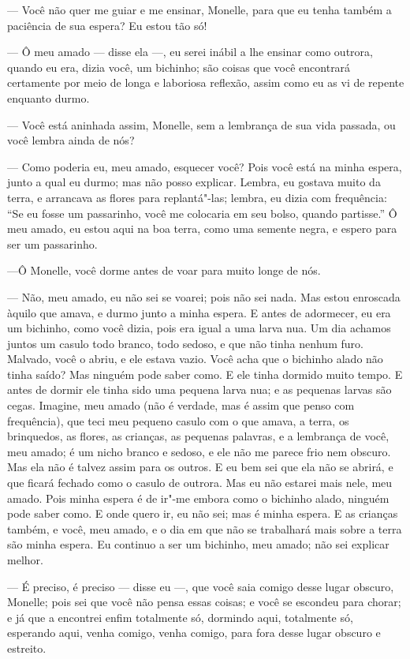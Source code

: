 --- Você não quer me guiar e me ensinar, Monelle, para que eu tenha
também a paciência de sua espera? Eu estou tão só!

--- Ô meu amado --- disse ela ---, eu serei inábil a lhe ensinar como outrora,
quando eu era, dizia você, um bichinho; são coisas que você encontrará
certamente por meio de longa e laboriosa reflexão, assim como eu as vi de
repente enquanto durmo.

--- Você está aninhada assim, Monelle, sem a lembrança de sua vida
passada, ou você lembra ainda de nós?

--- Como poderia eu, meu amado, esquecer você? Pois você está na minha
espera, junto a qual eu durmo; mas não posso explicar. Lembra, eu gostava
muito da terra, e arrancava as flores para replantá"-las; lembra, eu dizia
com frequência: “Se eu fosse um passarinho, você me colocaria em seu
bolso, quando partisse.” Ô meu amado, eu estou aqui na boa terra, como uma
semente negra, e espero para ser um passarinho.

---Ô Monelle, você dorme antes de voar para muito longe de nós.

--- Não, meu amado, eu não sei se voarei; pois não sei nada. Mas estou
enroscada àquilo que amava, e durmo junto a minha espera. E antes de
adormecer, eu era um bichinho, como você dizia, pois era igual a uma larva
nua. Um dia achamos juntos um casulo todo branco, todo sedoso, e que não
tinha nenhum furo. Malvado, você o abriu, e ele estava vazio. Você acha
que o bichinho alado não tinha saído? Mas ninguém pode saber como. E ele
tinha dormido muito tempo. E antes de dormir ele tinha sido uma pequena
larva nua; e as pequenas larvas são cegas. Imagine, meu amado (não é
verdade, mas é assim que penso com frequência), que teci meu pequeno
casulo com o que amava, a terra, os brinquedos, as flores, as crianças, as
pequenas palavras, e a lembrança de você, meu amado; é um nicho branco e
sedoso, e ele não me parece frio nem obscuro. Mas ela não é talvez assim
para os outros. E eu bem sei que ela não se abrirá, e que ficará fechado
como o casulo de outrora. Mas eu não estarei mais nele, meu amado. Pois
minha espera é de ir"-me embora como o bichinho alado, ninguém pode saber
como. E onde quero ir, eu não sei; mas é minha espera. E as crianças
também, e você, meu amado, e o dia em que não se trabalhará mais sobre a
terra são minha espera. Eu continuo a ser um bichinho, meu amado; não sei
explicar melhor.

--- É preciso, é preciso --- disse eu ---, que você saia comigo desse lugar
obscuro, Monelle; pois sei que você não pensa essas coisas; e você se
escondeu para chorar; e já que a encontrei enfim totalmente só, dormindo
aqui, totalmente só, esperando aqui, venha comigo, venha comigo, para fora
desse lugar obscuro e estreito.

